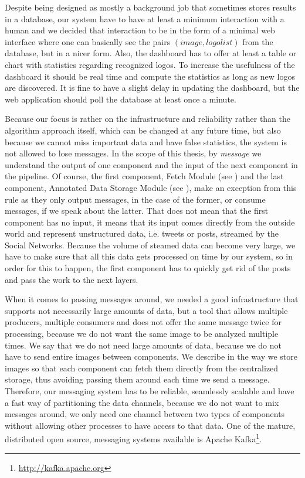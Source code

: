 Despite being designed as mostly a background job that sometimes stores
results in a database, our system have to have at least a minimum interaction
with a human and we decided that interaction to be in the form of a minimal
web interface where one can basically see the pairs \((image, logo list)\)
from the database, but in a nicer form. Also, the dashboard has to offer at
least a table or chart with statistics regarding recognized logos. To increase
the usefulness of the dashboard it should be real time and compute the
statistics as long as new logos are discovered. It is fine to have a slight
delay in updating the dashboard, but the web application should poll the
database at least once a minute.

Because our focus is rather on the infrastructure and reliability rather than
the algorithm approach itself, which can be changed at any future time, but
also because we cannot miss important data and have false statistics, the system
is not allowed to lose messages. In the scope of this thesis, by
\textit{message} we understand the output of one component and the input of
the next component in the pipeline. Of course, the first component, Fetch
Module (see ) and the last
component, Annotated Data Storage Module (see
), make an exception from this rule
as they only output messages, in the case of the former, or consume messages, if we speak
about the latter. That does not mean that the first component has no input, it
means that its input comes directly from the outside world and represent
unstructured data, i.e. tweets or posts, streamed by the Social Networks.
Because the volume of steamed data can become very large, we have to make sure
that all this data gets processed on time by our system, so in order for this
to happen, the first component has to quickly get rid of the posts and pass
the work to the next layers.

When it comes to passing messages around, we needed a good infrastructure that
supports not necessarily large amounts of data, but a tool that allows multiple producers,
multiple consumers and does not offer the same message twice for processing, because we do not
want the same image to be analyzed multiple times. We say that we
do not need large amounts of data, because we do not have to send entire
images between components. We describe in
 the way we store images
so that each component can fetch them directly from the centralized storage, thus avoiding
passing them around each time we send a message. Therefore, our messaging
system has to be reliable, seamlessly scalable and have a fast way of
partitioning the data channels, because we do not want to mix messages around,
we only need one channel between two types of components without allowing
other processes to have access to that data. One of the mature, distributed
open source, messaging systems available is Apache
Kafka\footnote{\url{http://kafka.apache.org}}.

